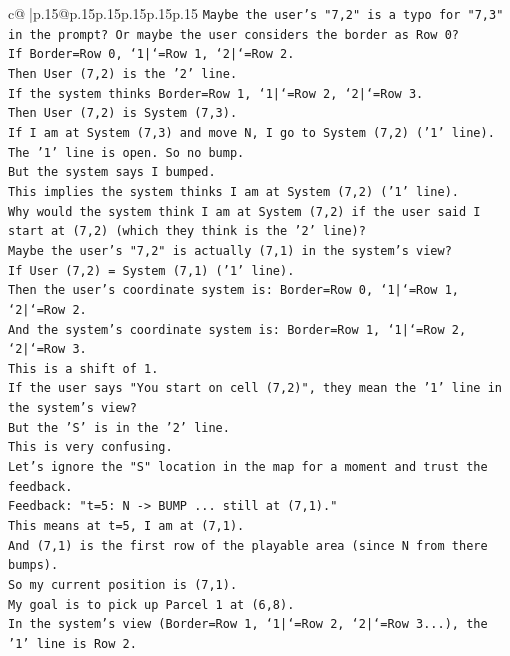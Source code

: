 \documentclass{article}
\begin{document}
{\begin{supertabular}{c@{$\;$}|p{.15\linewidth}@{}p{.15\linewidth}p{.15\linewidth}p{.15\linewidth}p{.15\linewidth}p{.15\linewidth}}
{{{\texttt{Maybe the user's "7,2" is a typo for "7,3" in the prompt? Or maybe the user considers the border as Row 0?} \\
\texttt{If Border=Row 0, `1|`=Row 1, `2|`=Row 2.} \\
\texttt{Then User (7,2) is the '2' line.} \\
\texttt{If the system thinks Border=Row 1, `1|`=Row 2, `2|`=Row 3.} \\
\texttt{Then User (7,2) is System (7,3).} \\
\texttt{If I am at System (7,3) and move N, I go to System (7,2) ('1' line).} \\
\texttt{The '1' line is open. So no bump.} \\
\texttt{But the system says I bumped.} \\
\texttt{This implies the system thinks I am at System (7,2) ('1' line).} \\
\texttt{Why would the system think I am at System (7,2) if the user said I start at (7,2) (which they think is the '2' line)?} \\
\texttt{Maybe the user's "7,2" is actually (7,1) in the system's view?} \\
\texttt{If User (7,2) = System (7,1) ('1' line).} \\
\texttt{Then the user's coordinate system is: Border=Row 0, `1|`=Row 1, `2|`=Row 2.} \\
\texttt{And the system's coordinate system is: Border=Row 1, `1|`=Row 2, `2|`=Row 3.} \\
\texttt{This is a shift of 1.} \\
\texttt{If the user says "You start on cell (7,2)", they mean the '1' line in the system's view?} \\
\texttt{But the 'S' is in the '2' line.} \\
\texttt{This is very confusing.} \\
\texttt{Let's ignore the "S" location in the map for a moment and trust the feedback.} \\
\texttt{Feedback: "t=5: N {-}> BUMP ... still at (7,1)."} \\
\texttt{This means at t=5, I am at (7,1).} \\
\texttt{And (7,1) is the first row of the playable area (since N from there bumps).} \\
\texttt{So my current position is (7,1).} \\
\texttt{My goal is to pick up Parcel 1 at (6,8).} \\
\texttt{In the system's view (Border=Row 1, `1|`=Row 2, `2|`=Row 3...), the '1' line is Row 2.} \\
}}}
\end{supertabular}}
\end{document}
